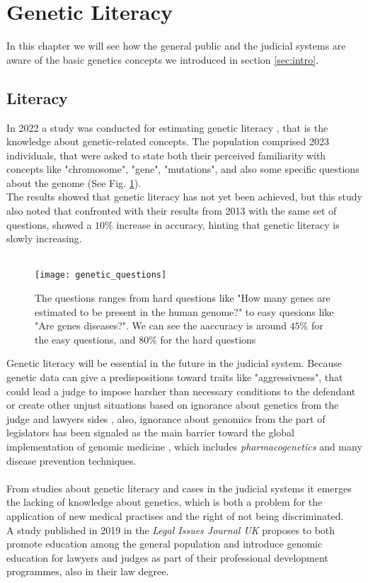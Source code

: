 \documentclass[12pt]{article}
\begin{document}
\section{Genetic Literacy}
\label{sec:literacy}
In this chapter we will see how the general public and the judicial systems are aware of the basic genetics concepts we introduced in section \ref{sec:intro}.\\
\subsection{Literacy}
In 2022 a study was conducted for estimating genetic literacy \cite{genetic_literacy}, that is the knowledge about genetic-related concepts.
 The population comprised 2023 individuals, that were asked to state both their perceived familiarity with concepts like "chromosome", "gene", "mutations", 
 and also some specific questions about the genome (See Fig. \ref{img:genetic_questions}).\\
The results showed that genetic literacy has not yet been achieved, but this study also noted that confronted with their results from 2013 with the same set of questions,
 showed a $10\%$ increase in accuracy, hinting that genetic literacy is slowly increasing.\\
 \\
\begin{figure}[H]
    \centering
    \texttt{[image: genetic\_questions]}
    \caption{The questions ranges from hard questions like "How many genes are estimated to be present in the human genome?" to easy quesions like "Are genes diseases?". We can see the aaccuracy is around $45\%$ for the easy questions, and $80\%$ for the hard questions}
    \label{img:genetic_questions}
\end{figure}
Genetic literacy will be essential in the future in the judicial system. Because genetic data can give a predispositions toward traits like "aggressivness",
 that could lead a judge to impose harsher than necessary conditions to the defendant or create other unjust situations based on ignorance about genetics from the judge and lawyers sides \cite{genetic_data_misuse}, 
 also, ignorance about genomics from the part of legislators has been signaled as the main barrier toward the global implementation of genomic medicine \cite{global_genomic_medicine}, 
which includes \emph{pharmacogenetics} and many disease prevention techniques.\\
\\
From studies about genetic literacy \cite{genetic_literacy} and cases in the judicial systems \cite{genetic_data_misuse} it emerges the lacking of knowledge about genetics, which is both 
a problem for the application of new medical practises \cite{global_genomic_medicine} and the right of not being discriminated.\\
A study published in 2019 in the \emph{Legal Issues Journal UK} proposes to both promote education among the general population and 
introduce genomic education for lawyers and judges as part of their professional development programmes, also in their law degree. \cite{genetic_data_misuse}
\end{document}
